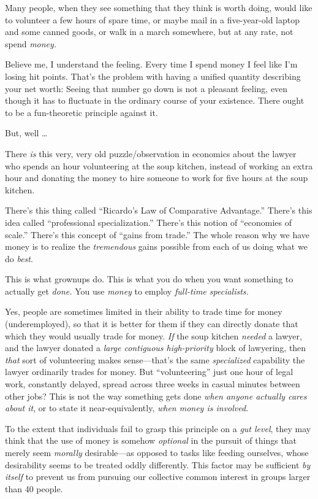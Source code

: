 {
 Many people, when they see something that they think is worth
doing, would like to volunteer a few hours of spare time, or maybe mail
in a five-year-old laptop and some canned goods, or walk in a march
somewhere, but at any rate, not spend \textit{money.}}

{
 Believe me, I understand the feeling. Every time I spend money I
feel like I'm losing hit points. That's
the problem with having a unified quantity describing your net worth:
Seeing that number go down is not a pleasant feeling, even though it
has to fluctuate in the ordinary course of your existence. There ought
to be a fun-theoretic principle against it.}

{
 But, well \ldots}

{
 There \textit{is} this very, very old puzzle/observation in
economics about the lawyer who spends an hour volunteering at the soup
kitchen, instead of working an extra hour and donating the money to
hire someone to work for five hours at the soup kitchen.}

{
 There's this thing called
``Ricardo's Law of Comparative
Advantage.'' There's this idea called
``professional specialization.''
There's this notion of ``economies of
scale.'' There's this concept of
``gains from trade.'' The whole
reason why we have money is to realize the \textit{tremendous} gains
possible from each of us doing what we do \textit{best}.}

{
 This is what grownups do. This is what you do when you want
something to actually get \textit{done.} You use \textit{money} to
employ \textit{full-time specialists.}}

{
 Yes, people are sometimes limited in their ability to trade time
for money (underemployed), so that it is better for them if they can
directly donate that which they would usually trade for money.
\textit{If} the soup kitchen \textit{needed} a lawyer, and the lawyer
donated a \textit{large contiguous high-priority} block of lawyering,
then \textit{that} sort of volunteering makes
sense---that's the same \textit{specialized} capability
the lawyer ordinarily trades for money. But
``volunteering'' just one hour of
legal work, constantly delayed, spread across three weeks in casual
minutes between other jobs? This is not the way something gets done
\textit{when anyone actually cares about it}, or to state it
near-equivalently, \textit{when money is involved}.}

{
 To the extent that individuals fail to grasp this principle on a
\textit{gut level}, they may think that the use of money is somehow
\textit{optional} in the pursuit of things that merely seem
\textit{morally} desirable---as opposed to tasks like feeding
ourselves, whose desirability seems to be treated oddly differently.
This factor may be sufficient \textit{by itself} to prevent us from
pursuing our collective common interest in groups larger than 40
people.}

